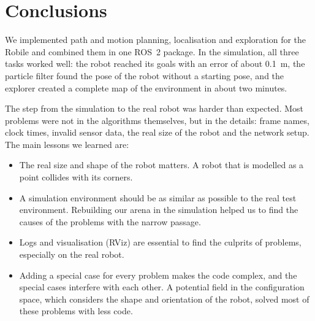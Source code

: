 \documentclass[../report.tex]{subfiles}
\begin{document}
    \section{Conclusions}
    \label{sec:conclusions}

    We implemented path and motion planning, localisation and exploration for the Robile and combined them in one ROS~2 package.
    In the simulation, all three tasks worked well: the robot reached its goals with an error of about \SI{0.1}{m}, the particle filter found the pose of the robot without a starting pose, and the explorer created a complete map of the environment in about two minutes.

    The step from the simulation to the real robot was harder than expected.
    Most problems were not in the algorithms themselves, but in the details: frame names, clock times, invalid sensor data, the real size of the robot and the network setup.
    The main lessons we learned are:
    \begin{itemize}
        \item The real size and shape of the robot matters. A robot that is modelled as a point collides with its corners.
        \item A simulation environment should be as similar as possible to the real test environment. Rebuilding our arena in the simulation helped us to find the causes of the problems with the narrow passage.
        \item Logs and visualisation (RViz) are essential to find the culprits of problems, especially on the real robot.
        \item Adding a special case for every problem makes the code complex, and the special cases interfere with each other. A potential field in the configuration space, which considers the shape and orientation of the robot, solved most of these problems with less code.
    \end{itemize}
\end{document}
